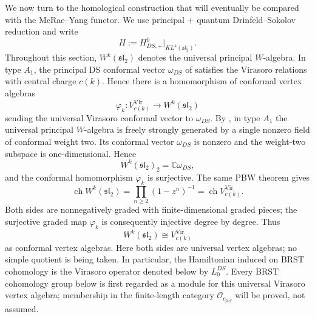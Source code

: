 \documentclass[12pt,leqno]{amsart}
\numberwithin{equation}{section}
\newcommand{\KL}{KL}
\newcommand{\Oc}{\mathcal O}
\def\C{\mathbb{C}}
\begin{document}
We now turn to the homological construction that will eventually be
compared with the McRae--Yang functor.  We use principal $+$ quantum
Drinfeld--Sokolov reduction and write
\[
 H:=H^0_{DS,+}\big|_{\KL^k(\mathfrak{sl}_2)}.
\]
Throughout this section, $W^k(\mathfrak{sl}_2)$ denotes the universal
principal $W$-algebra.  In type $A_1$, the principal DS conformal vector
$\omega_{DS}$ of \cite[Section~4.17]{ArakawaW} satisfies the Virasoro
relations with central charge $c(k)$.  Hence there is a homomorphism of
conformal vertex algebras
\[
 \varphi_k:V^{\mathrm{Vir}}_{c(k)}
 \longrightarrow W^k(\mathfrak{sl}_2)
\]
sending the universal Virasoro conformal vector to $\omega_{DS}$.
By \cite[Proposition~4.12.1]{ArakawaW}, in type $A_1$ the universal
principal $W$-algebra is freely strongly generated by a single nonzero
field of conformal weight two.  Its conformal vector $\omega_{DS}$ is
nonzero and the weight-two subspace is one-dimensional.  Hence
\[
 W^k(\mathfrak{sl}_2)_2=\C\omega_{DS},
\]
and the conformal homomorphism $\varphi_k$ is surjective.  The same PBW theorem gives
\[
 \operatorname{ch}W^k(\mathfrak{sl}_2)
 =\prod_{n\ge2}(1-z^n)^{-1}
 =\operatorname{ch}V^{\mathrm{Vir}}_{c(k)}.
\]
Both sides are nonnegatively graded with finite-dimensional graded
pieces; the surjective graded map $\varphi_k$ is consequently injective
degree by degree.  Thus
\[
 W^k(\mathfrak{sl}_2)\cong V^{\mathrm{Vir}}_{c(k)}
\]
as conformal vertex algebras.  Here both sides are universal vertex
algebras; no simple quotient is being taken.  In particular, the Hamiltonian induced
on BRST cohomology is the Virasoro operator denoted below by
$L^{DS}_0$.  Every BRST cohomology group below is first regarded as a
module for this universal Virasoro vertex algebra; membership in the
finite-length category $\Oc_{c_{p,q}}$ will be proved, not assumed.
\end{document}
